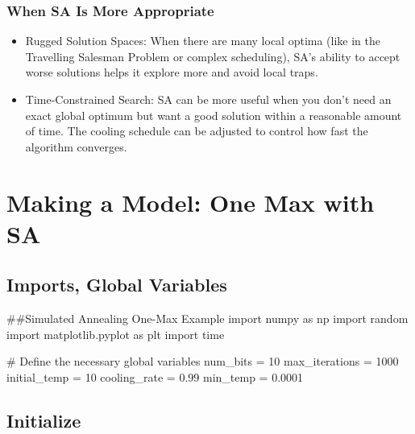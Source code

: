 \documentclass[
  letterpaper,
  DIV=11,
  numbers=noendperiod]{scrreprt}
\newenvironment{Shaded}{\begin{snugshade}}{\end{snugshade}}
\newcommand{\CommentTok}[1]{\textcolor[rgb]{0.37,0.37,0.37}{#1}}
\newcommand{\DecValTok}[1]{\textcolor[rgb]{0.68,0.00,0.00}{#1}}
\newcommand{\FloatTok}[1]{\textcolor[rgb]{0.68,0.00,0.00}{#1}}
\newcommand{\ImportTok}[1]{\textcolor[rgb]{0.00,0.46,0.62}{#1}}
\newcommand{\NormalTok}[1]{\textcolor[rgb]{0.00,0.23,0.31}{#1}}
\newcommand{\OperatorTok}[1]{\textcolor[rgb]{0.37,0.37,0.37}{#1}}
\providecommand{\tightlist}{%
  \setlength{\itemsep}{0pt}\setlength{\parskip}{0pt}}\usepackage{longtable,booktabs,array}
\begin{document}
\subsection{When SA Is More
Appropriate}\label{when-sa-is-more-appropriate}

\begin{itemize}
\tightlist
\item
  Rugged Solution Spaces: When there are many local optima (like in the
  Travelling Salesman Problem or complex scheduling), SA's ability to
  accept worse solutions helps it explore more and avoid local traps.
\item
  Time-Constrained Search: SA can be more useful when you don't need an
  exact global optimum but want a good solution within a reasonable
  amount of time. The cooling schedule can be adjusted to control how
  fast the algorithm converges.
\end{itemize}


\chapter{Making a Model: One Max with
SA}\label{making-a-model-one-max-with-sa}

\section{Imports, Global Variables}\label{imports-global-variables}

\begin{Shaded}
\begin{Highlighting}[]
\CommentTok{\#\#Simulated Annealing One{-}Max Example}
\ImportTok{import}\NormalTok{ numpy }\ImportTok{as}\NormalTok{ np}
\ImportTok{import}\NormalTok{ random}
\ImportTok{import}\NormalTok{ matplotlib.pyplot }\ImportTok{as}\NormalTok{ plt}
\ImportTok{import}\NormalTok{ time}

\CommentTok{\# Define the necessary global variables}
\NormalTok{num\_bits }\OperatorTok{=} \DecValTok{10}
\NormalTok{max\_iterations }\OperatorTok{=} \DecValTok{1000}
\NormalTok{initial\_temp }\OperatorTok{=} \DecValTok{10}
\NormalTok{cooling\_rate }\OperatorTok{=} \FloatTok{0.99}
\NormalTok{min\_temp }\OperatorTok{=} \FloatTok{0.0001}
\end{Highlighting}
\end{Shaded}

\section{Initialize}\label{initialize}
\end{document}
